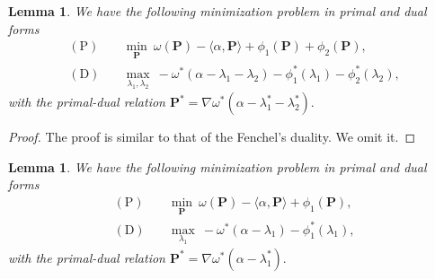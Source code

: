 \documentclass[11pt]{book}
\newtheorem{lemma}[theorem]{Lemma}
\begin{document}
\begin{lemma}\label{lemma:primal_dual_twophi}
    We have the following minimization problem in primal and dual forms
    \begin{align*}
        (\mathrm{P})\quad &\min_{\mathbf{P}} \ \omega(\mathbf{P}) - \langle \alpha, \mathbf{P} \rangle + \phi_1(\mathbf{P}) + \phi_2(\mathbf{P}), \\
        (\mathrm{D})\quad &\max_{\lambda_1,\lambda_2} \ - \omega^*(\alpha-\lambda_1-\lambda_2) - \phi_1^*(\lambda_1) - \phi_2^*(\lambda_2),
    \end{align*}
    with the primal-dual relation
    $
      \mathbf{P}^* = \nabla \omega^*(\alpha - \lambda_1^* - \lambda_2^*).
    $
  \end{lemma}

\begin{proof}
    The proof is similar to that of the Fenchel's duality. We omit it.
\end{proof}


\begin{lemma}\label{lemma:primal_dual_onephi}
    We have the following minimization problem in primal and dual forms
    \begin{align*}
      (\mathrm{P})\quad &  \min_{\mathbf{P}} \  \omega(\mathbf{P}) - \langle \alpha, \mathbf{P} \rangle + \phi_1(\mathbf{P}), \\
      (\mathrm{D})\quad &  \max_{\lambda_1}\ - \omega^*(\alpha-\lambda_1) - \phi_1^*(\lambda_1),
    \end{align*}
    with the primal-dual relation
    $
      \mathbf{P}^* = \nabla \omega^*(\alpha - \lambda_1^*).
    $
\end{lemma}
\end{document}
